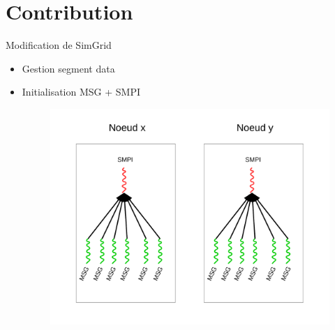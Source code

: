 \documentclass[11pt,xcolor=dvipsnames,presentation]{beamer}
\begin{document}
\section{Contribution}
\label{sec-5}
\begin{frame}[label=sec-5-1]{Modification de SimGrid}
\begin{itemize}
\item Gestion segment data
\item Initialisation MSG + SMPI
\begin{figure}[tbh]
\centering
\vspace{-1.5mm}
   \includegraphics[height=.8\paperheight]{../Img/Processus.pdf}
\end{figure}
\end{itemize}
\end{frame}
\end{document}
